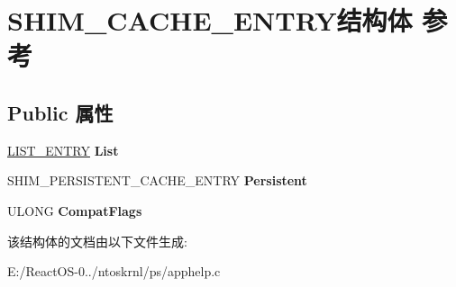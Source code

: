 \hypertarget{struct_s_h_i_m___c_a_c_h_e___e_n_t_r_y}{}\section{S\+H\+I\+M\+\_\+\+C\+A\+C\+H\+E\+\_\+\+E\+N\+T\+R\+Y结构体 参考}
\label{struct_s_h_i_m___c_a_c_h_e___e_n_t_r_y}
\subsection*{Public 属性}
\begin{DoxyCompactItemize}
\item 
\mbox{\label{struct_s_h_i_m___c_a_c_h_e___e_n_t_r_y_af029d1414103bd9328c88d49bc2ff9c6}} 
\hyperlink{struct___l_i_s_t___e_n_t_r_y}{L\+I\+S\+T\+\_\+\+E\+N\+T\+RY} {\bfseries List}
\item 
\mbox{\label{struct_s_h_i_m___c_a_c_h_e___e_n_t_r_y_af32c2b13abcba7898b68e0daa2e91dab}} 
S\+H\+I\+M\+\_\+\+P\+E\+R\+S\+I\+S\+T\+E\+N\+T\+\_\+\+C\+A\+C\+H\+E\+\_\+\+E\+N\+T\+RY {\bfseries Persistent}
\item 
\mbox{\label{struct_s_h_i_m___c_a_c_h_e___e_n_t_r_y_ac32db1e08cc1e9304c6f3ca990c3a391}} 
U\+L\+O\+NG {\bfseries Compat\+Flags}
\end{DoxyCompactItemize}


该结构体的文档由以下文件生成\+:\begin{DoxyCompactItemize}
\item 
E\+:/\+React\+O\+S-\/0../ntoskrnl/ps/apphelp.\+c\end{DoxyCompactItemize}
